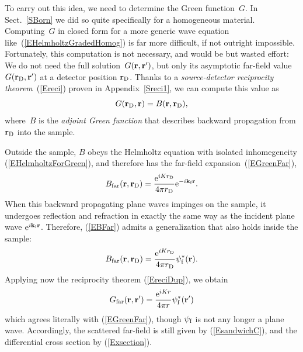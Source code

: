 To carry out this idea, we need to determine the Green function~$G$.
%
In Sect.~\ref{SBorn} we did so quite specifically
for a homogeneous material.
Computing~$G$ in closed form for a more generic wave equation
like~(\ref{EHelmholtzGradedHomog}) is far more difficult,
if not outright impossible.
Fortunately, this computation is not necessary,
and would be but wasted effort:
We do not need the full solution~$G(\mathbf{r},\mathbf{r}')$,
but only its asymptotic far-field value $G(\mathbf{r}_\text{D},\mathbf{r}')$
at a detector position $\mathbf{r}_\text{D}$.
%
Thanks to a \textit{source-detector reciprocity theorem}~(\ref{Ereci})
%
proven in Appendix~\ref{Sreci1},
we can compute this value
as
\begin{equation}\label{EreciDup}
  G(\mathbf{r}_\text{D},\mathbf{r}) = B(\mathbf{r},\mathbf{r}_\text{D}),
\end{equation}
%
where~$B$ is the \textit{adjoint Green function}
that describes backward propagation from $\mathbf{r}_\text{D}$ into the sample.

Outside the sample,
$B$ obeys the Helmholtz equation
with isolated inhomegeneity (\ref{EHelmholtzForGreen}),
and therefore has the far-field expansion~(\ref{EGreenFar}),
%
\begin{equation}\label{EBFar}
  B_\text{far}(\mathbf{r},\mathbf{r}_\text{D})
  =\frac{\text{e}^{iKr_\text{D}}}{4\pi r_\text{D}}\text{e}^{-i\mathbf{k}_{\text{f}} \mathbf{r}}.
\end{equation}
When this backward propagating plane waves impinges on the sample,
it undergoes reflection and refraction in exactly the same way as
the incident plane wave $\text{e}^{i\mathbf{k}_{\text{i}}\mathbf{r}}$.
Therefore,
 (\ref{EBFar}) admits a generalization that also holds inside the sample:
\begin{equation}\label{EBFull}
  B_\text{far}(\mathbf{r},\mathbf{r}_\text{D})
  = \frac{\text{e}^{iKr_\text{D}}}{4\pi r_\text{D}}\psi^*_{\text{f}}(\mathbf{r}).
\end{equation}
Applying now the reciprocity theorem (\ref{EreciDup}),
we obtain
\begin{equation}\label{EGreenFarDWBA}
  G_\text{far}(\mathbf{r},\mathbf{r}')
  = \frac{\text{e}^{iKr}}{4\pi r}\psi^*_{\text{f}}(\mathbf{r}')
\end{equation}
which agrees literally with (\ref{EGreenFar}),
though $\psi_{\text{f}}$ is not any longer a plane wave.
Accordingly,
the scattered far-field is still given by (\ref{EsandwichC}),
and the differential cross section by (\ref{Exsection}).

